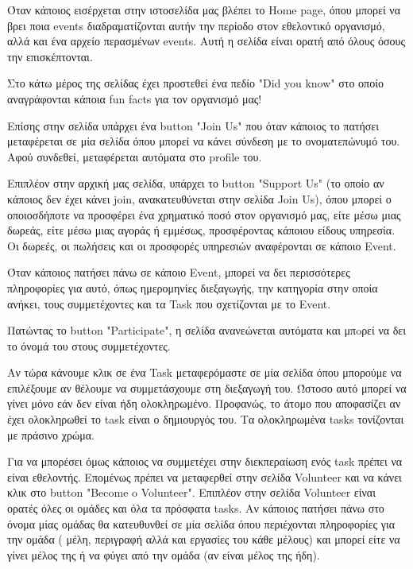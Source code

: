 \documentclass[manuscript,screen,review]{acmart}
\newcommand{\en}[1]{\foreignlanguage{english}{#1}}
\begin{document}
Όταν κάποιος εισέρχεται στην ιστοσελίδα μας βλέπει το \en{Home page}, όπου μπορεί να βρει ποια \en{events} διαδραματίζονται αυτήν την περίοδο στον εθελοντικό οργανισμό, αλλά και ένα αρχείο περασμένων \en{events}. Αυτή η σελίδα είναι ορατή από όλους όσους την επισκέπτονται. 

Στο κάτω μέρος της σελίδας έχει προστεθεί ένα πεδίο \en{"Did you know"} στο οποίο αναγράφονται κάποια \en{fun facts } για τον οργανισμό μας! 

Επίσης στην σελίδα υπάρχει ένα \en{button "Join Us"} που όταν κάποιος το πατήσει μεταφέρεται σε μία σελίδα όπου μπορεί να κάνει σύνδεση με το ονοματεπώνυμό του. Αφού συνδεθεί, μεταφέρεται αυτόματα στο \en{profile} του.

Επιπλέον στην αρχική μας σελίδα, υπάρχει το \en{button "Support Us"} (το οποίο αν κάποιος δεν έχει κάνει \en{join}, ανακατευθύνεται στην σελίδα \en{Join Us}), όπου μπορεί ο οποιοσδήποτε να προσφέρει ένα χρηματικό ποσό στον οργανισμό μας, είτε μέσω μιας δωρεάς, είτε μέσω μιας αγοράς ή εμμέσως, προσφέροντας κάποιου είδους υπηρεσία. Οι δωρεές, οι πωλήσεις και οι προσφορές υπηρεσιών αναφέρονται σε κάποιο \en{Event}.

Όταν κάποιος πατήσει πάνω σε κάποιο \en{Event}, μπορεί να δει περισσότερες πληροφορίες για αυτό, όπως ημερομηνίες διεξαγωγής, την κατηγορία στην οποία ανήκει, τους συμμετέχοντες και τα \en{Task} που σχετίζονται με το \en{Event}. 

Πατώντας το \en{button "Participate"}, η σελίδα ανανεώνεται αυτόματα και μπoρεί να δει το όνομά του στους συμμετέχοντες.

Αν τώρα κάνουμε κλικ σε ένα \en{Task} μεταφερόμαστε σε μία σελίδα όπου μπορούμε να επιλέξουμε αν θέλουμε να συμμετάσχουμε στη διεξαγωγή του. Ώστοσο αυτό μπορεί να γίνει μόνο εάν δεν είναι ήδη ολοκληρωμένο. Προφανώς, το άτομο που αποφασίζει αν έχει ολοκληρωθεί το \en{task} είναι ο δημιουργός του. Τα ολοκληρωμένα \en{tasks} τονίζονται με πράσινο χρώμα.

Για να μπορέσει όμως κάποιος να συμμετέχει στην διεκπεραίωση ενός \en{task} πρέπει να είναι εθελοντής. Επομένως πρέπει να μεταφερθεί στην σελίδα \en{Volunteer} και να κάνει κλικ στο \en{button "Become o Volunteer"}. Επιπλέον στην σελίδα \en{Volunteer} είναι ορατές όλες οι ομάδες και όλα τα πρόσφατα \en{tasks}. Αν κάποιος πατήσει πάνω στο όνομα μίας ομάδας θα κατευθυνθεί σε μία σελίδα όπου περιέχονται πληροφορίες για την ομάδα ( μέλη, περιγραφή αλλά και εργασίες του κάθε μέλους) και μπορεί είτε να γίνει μέλος της ή να φύγει από την ομάδα (αν είναι μέλος της ήδη).
\end{document}
